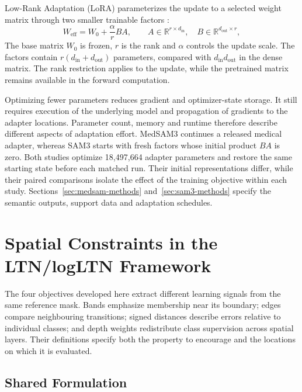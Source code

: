 \documentclass[12pt,a4paper]{article}
\begin{document}
Low-Rank Adaptation (LoRA) parameterizes the update to a selected weight matrix
through two smaller trainable factors \cite{hu2021lora}:
\begin{equation}
W_{\mathrm{eff}}=W_0+\frac{\alpha}{r}BA,
\qquad
A\in\mathbb{R}^{r\times d_{\mathrm{in}}},\quad
B\in\mathbb{R}^{d_{\mathrm{out}}\times r},
\label{eq:lora-weight-update}
\end{equation}
The base matrix $W_0$ is frozen, $r$ is the rank and $\alpha$ controls
the update scale. The factors contain
$r(d_{\mathrm{in}}+d_{\mathrm{out}})$ parameters, compared with
$d_{\mathrm{in}}d_{\mathrm{out}}$ in the dense matrix. The rank restriction
applies to the update, while the pretrained matrix remains available
in the forward computation.

Optimizing fewer parameters reduces gradient and optimizer-state storage.
It still requires execution of the underlying model and propagation of
gradients to the adapter locations. Parameter count, memory and runtime
therefore describe different aspects of adaptation effort. MedSAM3
continues a released medical adapter, whereas SAM3 starts with fresh
factors whose initial product $BA$ is zero. Both studies optimize
18,497,664 adapter parameters and restore the same starting state before
each matched run. Their initial representations differ, while their
paired comparisons isolate the effect of the training objective within
each study. Sections~\ref{sec:medsam-methods} and~\ref{sec:sam3-methods}
specify the semantic outputs, support data and adaptation schedules.

\clearpage
\section{Spatial Constraints in the LTN/logLTN Framework}
\label{sec:spatial-constraints}

The four objectives developed here extract different learning signals from
the same reference mask. Bands emphasize membership near its boundary;
edges compare neighbouring transitions; signed distances describe errors
relative to individual classes; and depth weights redistribute class
supervision across spatial layers. Their definitions specify both
the property to encourage and the locations on which it is evaluated.

\subsection{Shared Formulation}\label{sec:constraint-formulation}
\end{document}
